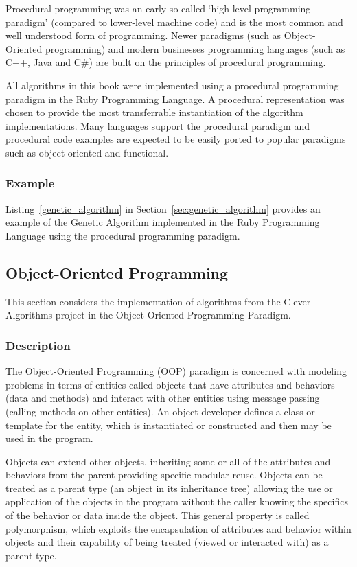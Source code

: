 Procedural programming was an early so-called `high-level programming paradigm' (compared to lower-level machine code) and is the most common and well understood form of programming. Newer paradigms (such as Object-Oriented programming) and modern businesses programming languages (such as C++, Java and C\#) are built on the principles of procedural programming.

All algorithms in this book were implemented using a procedural programming paradigm in the Ruby Programming Language. A procedural representation was chosen to provide the most transferrable instantiation of the algorithm implementations. Many languages support the procedural paradigm and procedural code examples are expected to be easily ported to popular paradigms such as object-oriented and functional.

\subsubsection{Example}
Listing~\ref{genetic_algorithm} in Section~\ref{sec:genetic_algorithm} provides an example of the Genetic Algorithm implemented in the Ruby Programming Language using the procedural programming paradigm.


\subsection{Object-Oriented Programming}
\label{sec:oop}
This section considers the implementation of algorithms from the Clever Algorithms project in the Object-Oriented Programming Paradigm.

\subsubsection{Description}
The Object-Oriented Programming (OOP) paradigm is concerned with modeling problems in terms of entities called objects that have attributes and behaviors (data and methods) and interact with other entities using message passing (calling methods on other entities). An object developer defines a class or template for the entity, which is instantiated or constructed and then may be used in the program.

Objects can extend other objects, inheriting some or all of the attributes and behaviors from the parent providing specific modular reuse. Objects can be treated as a parent type (an object in its inheritance tree) allowing the use or application of the objects in the program without the caller knowing the specifics of the behavior or data inside the object. This general property is called polymorphism, which exploits the encapsulation of attributes and behavior within objects and their capability of being treated (viewed or interacted with) as a parent type.


